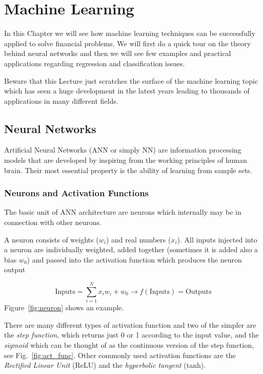 \chapter{Machine Learning}
\label{ch:neural-network}

In this Chapter we will see how machine learning techniques can be
successfully applied to solve financial problems. We will first do a
quick tour on the theory behind neural networks and then we will see 
few examples and practical applications regarding regression and
classification issues.

Beware that this Lecture just scratches the surface of the
machine learning topic which has seen a huge development in the latest
years leading to thousands of applications in many different fields.
    
\section{Neural Networks}\label{neural-networks}

Artificial Neural Networks (ANN or simply NN) are information processing
models that are developed by inspiring from the working principles of
human brain. Their most essential property is the ability of learning
from sample sets.

\subsection{Neurons and Activation Functions}
The basic unit of ANN architecture are neurons which internally may be in
connection with other neurons.

A neuron consists of weights (\(w_i\)) and real numbers (\(x_i\)). All
inputs injected into a neuron are individually weighted, added together
(sometimes it is added also a bias \(w_0\)) and passed into the
activation function which produces the neuron output

\[ \textrm{Inputs} = \sum_{i=1}^{N} x_i w_i +w_0 \rightarrow f(\textrm{Inputs}) = \textrm{Outputs}\]
Figure~\ref{fig:neuron} shows an example.

There are many different types of activation function and two of the simpler are the \emph{step function},
which returns just 0 or 1 according
to the input value, and the \emph{sigmoid} which can be thought
of as the continuous version of the step function, see Fig.~\ref{fig:act_func}.
Other commonly used activation functions are the \emph{Rectified Linear Unit}
(ReLU) and the \emph{hyperbolic tangent} (tanh).

